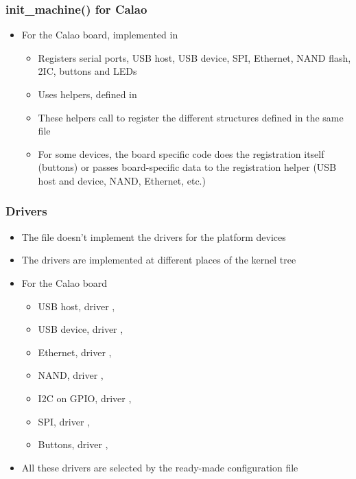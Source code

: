 \begin{frame}
  \frametitle{init\_machine() for Calao}
  \begin{itemize}
  \item For the Calao board, implemented in 
    \begin{itemize}
    \item Registers serial ports, USB host, USB device, SPI, Ethernet,
      NAND flash, 2IC, buttons and LEDs
    \item Uses  helpers, defined in
    \item These helpers call  to
      register the different  structures defined
      in the same file
    \item For some devices, the board specific code does the
      registration itself (buttons) or passes board-specific data to
      the registration helper (USB host and device, NAND, Ethernet,
      etc.)
    \end{itemize}
  \end{itemize}
\end{frame}

\begin{frame}
  \frametitle{Drivers}
  \begin{itemize}
  \item The  file doesn't implement the
    drivers for the platform devices
  \item The drivers are implemented at different places of the kernel
    tree
  \item For the Calao board
    \begin{itemize}
    \item USB host, driver ,
    \item USB device, driver ,
    \item Ethernet, driver , 
    \item NAND, driver ,
    \item I2C on GPIO, driver ,
    \item SPI, driver , 
    \item Buttons, driver ,
    \end{itemize}
  \item All these drivers are selected by the ready-made configuration
    file
  \end{itemize}
\end{frame}

